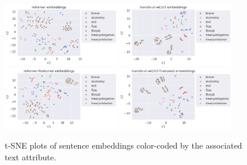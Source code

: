 \documentclass{article}
\begin{document}
\begin{figure}
    \centering
    \includegraphics[width=0.45\textwidth]{plots/sanity_check/reformer.png}
    \includegraphics[width=0.45\textwidth]{plots/sanity_check/transfo-xl-wt103.png}
    \includegraphics[width=0.45\textwidth]{plots/sanity_check/reformer-finetuned.png}
    \includegraphics[width=0.45\textwidth]{plots/sanity_check/transfo-xl-wt103-finetuned.png}
    \caption{t-SNE plots of sentence embeddings color-coded by the associated text attribute.}
    \label{fig:alias_check2}
\end{figure}
\end{document}
